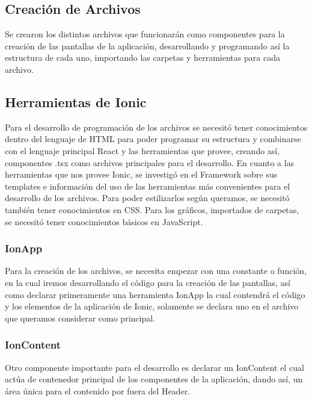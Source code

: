             \subsection{Creación de Archivos}
                Se crearon los distintos archivos que funcionarán como componentes para la creación de las pantallas de la aplicación, desarrollando y programando así la estructura de cada uno, importando las carpetas y herramientas para cada archivo.\par

            \subsection{Herramientas de Ionic}
                Para el desarrollo de programación de los archivos se necesitó tener conocimientos dentro del lenguaje de HTML para poder programar su estructura y combinarse con el lenguaje principal React y las herramientas que provee, creando así, componentes .tsx como archivos principales para el desarrollo. En cuanto a las herramientas que nos provee Ionic, se investigó en el Framework sobre sus templates e información del uso de las herramientas más convenientes para el desarrollo de los archivos. Para poder estilizarlos según queramos, se necesitó también tener conocimientos en CSS. Para los gráficos, importados de carpetas, se necesitó tener conocimientos básicos en JavaScript.\par
                
                \subsubsection{IonApp}
                    Para la creación de los archivos, se necesita empezar con una constante o función, en la cual iremos desarrollando el código para la creación de las pantallas, así como declarar primeramente una herramienta IonApp la cual contendrá el código y los elementos de la aplicación de Ionic, solamente se declara uno en el archivo que queramos considerar como principal.\par
                
                \subsubsection{IonContent}
                    Otro componente importante para el desarrollo es declarar un IonContent el cual actúa de contenedor principal de los componentes de la aplicación, dando así, un área única para el contenido por fuera del Header.\par
                
